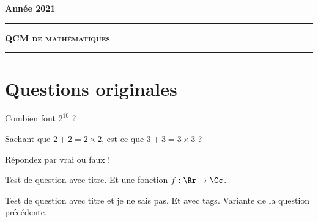 \documentclass[12pt,a4paper]{article}
\begin{document}
 
 


\hfill\textbf{Ann\'ee 2021}

\vspace*{0.5ex}
\hrule\vspace*{1.5ex} 
\hfil\textsc{\textbf{\Large QCM de mathématiques}}
\vspace*{1ex} \hrule 
\vspace*{5ex} 


\section{Questions originales}


\begin{question}

Combien font $2^{10}$ ? %

\begin{answers}  
\end{answers}
\end{question}



\begin{question}
Sachant que $2+2=2\times 2$, 
est-ce que $3+3 = 3\times 3$ ?

Répondez par vrai ou faux !
\begin{answers}

   

\end{answers}
\end{question}



\begin{question}

Test de question avec titre. Et une fonction $f : \Rr \to \Cc$. 
\begin{answers}


\end{answers}
\end{question}



\begin{question} 
\qkeeporder
\qidontknow

Test de question avec titre et je ne sais pas. Et avec tags. Variante de la question précédente.

\begin{answers}
\end{answers}
\end{question}
\end{document}
